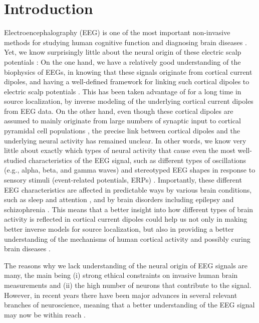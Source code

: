 \documentclass[preprint,10pt,authoryear]{elsarticle}
\begin{document}
\section{Introduction}\label{sec:introduction}

Electroencephalography (EEG) is one of the most important non-invasive methods for studying human cognitive function and diagnosing brain diseases \citep{COHEN2017, Pesaran2018}.  Yet, we know surprisingly little about the neural origin of these electric scalp potentials \citep{COHEN2017}: On the one hand, we have a relatively good understanding of the biophysics of EEGs, in knowing that these signals originate from cortical current dipoles, and having a well-defined framework for linking such cortical dipoles to electric scalp potentials \citep{NUNEZ2006, Ness2020}. This has been taken advantage of for a long time in source localization, by inverse modeling of the underlying cortical current dipoles from EEG data. On the other hand, even though these cortical dipoles are assumed to mainly originate from
large numbers of synaptic input to cortical pyramidal cell populations \citep{NUNEZ2006, SILVA2013, Pesaran2018, Ilmoniemi2019, Ness2020},
the precise link between cortical dipoles and the underlying neural activity has remained unclear. In other words, we know very little about exactly which types of neural activity that cause even the most well-studied characteristics of the EEG signal, such as different types of oscillations (e.g., alpha, beta, and gamma waves) and stereotyped EEG shapes in response to sensory stimuli (event-related potentials, ERPs) \citep{COHEN2017}. Importantly, these different EEG characteristics are affected in predictable ways by various brain conditions, such as sleep and attention \citep{Klimesch1998, Palva2011, Siegel2012}, and by brain disorders including epilepsy and schizophrenia \citep{Niedermeyer2003, Light2013, Freestone2015, MAKI2019}. 
This means that a better insight into how different types of brain activity is reflected in cortical current dipoles could help us not only in making better inverse models for source localization, but also in providing a better understanding of the mechanisms of human cortical activity and possibly curing brain diseases  \citep{Uhlirova2016, COHEN2017, MAKI2019}.

The reasons why we lack understanding of the neural origin of EEG signals are many, the main being (i) strong ethical constraints on invasive human brain measurements and (ii) the high number of neurons that contribute to the signal. However, in recent years there have been major advances in several relevant branches of neuroscience, meaning that a better understanding of the EEG signal may now be within reach \citep{Uhlirova2016, COHEN2017}.
\end{document}
